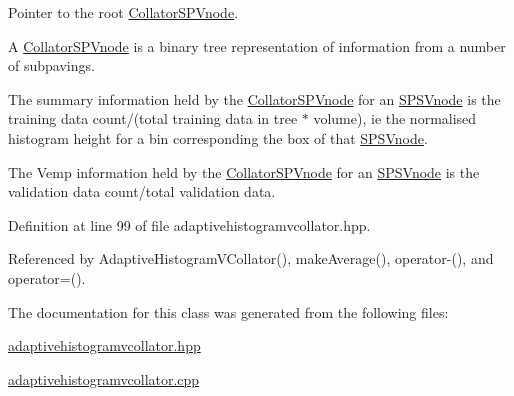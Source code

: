 \-Pointer to the root \hyperlink{classsubpavings_1_1CollatorSPVnode}{\-Collator\-S\-P\-Vnode}. 

\-A \hyperlink{classsubpavings_1_1CollatorSPVnode}{\-Collator\-S\-P\-Vnode} is a binary tree representation of information from a number of subpavings.

\-The summary information held by the \hyperlink{classsubpavings_1_1CollatorSPVnode}{\-Collator\-S\-P\-Vnode} for an \hyperlink{classsubpavings_1_1SPSVnode}{\-S\-P\-S\-Vnode} is the training data count/(total training data in tree $\ast$ volume), ie the normalised histogram height for a bin corresponding the box of that \hyperlink{classsubpavings_1_1SPSVnode}{\-S\-P\-S\-Vnode}.

\-The \-Vemp information held by the \hyperlink{classsubpavings_1_1CollatorSPVnode}{\-Collator\-S\-P\-Vnode} for an \hyperlink{classsubpavings_1_1SPSVnode}{\-S\-P\-S\-Vnode} is the validation data count/total validation data. 

\-Definition at line 99 of file adaptivehistogramvcollator.\-hpp.



\-Referenced by \-Adaptive\-Histogram\-V\-Collator(), make\-Average(), operator-\/(), and operator=().



\-The documentation for this class was generated from the following files\-:\begin{DoxyCompactItemize}
\item 
\hyperlink{adaptivehistogramvcollator_8hpp}{adaptivehistogramvcollator.\-hpp}\item 
\hyperlink{adaptivehistogramvcollator_8cpp}{adaptivehistogramvcollator.\-cpp}\end{DoxyCompactItemize}
